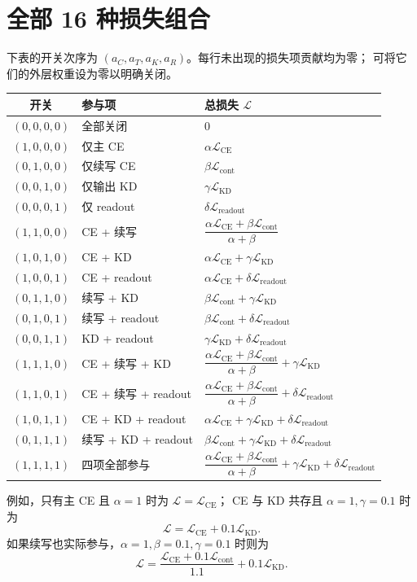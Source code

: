 \documentclass[UTF8,a4paper,11pt]{ctexart}
\newcommand{\CE}{\mathcal{L}_{\mathrm{CE}}}
\newcommand{\CT}{\mathcal{L}_{\mathrm{cont}}}
\newcommand{\KD}{\mathcal{L}_{\mathrm{KD}}}
\newcommand{\RO}{\mathcal{L}_{\mathrm{readout}}}
\begin{document}
\section{全部 16 种损失组合}

下表的开关次序为 $(a_C,a_T,a_K,a_R)$。每行未出现的损失项贡献均为零；
可将它们的外层权重设为零以明确关闭。

\begin{longtable}{cll}
\toprule
开关 & 参与项 & 总损失 $\mathcal{L}$ \\
\midrule
\endhead
$(0,0,0,0)$ & 全部关闭 & $0$ \\
$(1,0,0,0)$ & 仅主 CE & $\alpha\CE$ \\
$(0,1,0,0)$ & 仅续写 CE & $\beta\CT$ \\
$(0,0,1,0)$ & 仅输出 KD & $\gamma\KD$ \\
$(0,0,0,1)$ & 仅 readout & $\delta\RO$ \\
\addlinespace
$(1,1,0,0)$ & CE + 续写 & $\dfrac{\alpha\CE+\beta\CT}{\alpha+\beta}$ \\[6pt]
$(1,0,1,0)$ & CE + KD & $\alpha\CE+\gamma\KD$ \\
$(1,0,0,1)$ & CE + readout & $\alpha\CE+\delta\RO$ \\
$(0,1,1,0)$ & 续写 + KD & $\beta\CT+\gamma\KD$ \\
$(0,1,0,1)$ & 续写 + readout & $\beta\CT+\delta\RO$ \\
$(0,0,1,1)$ & KD + readout & $\gamma\KD+\delta\RO$ \\
\addlinespace
$(1,1,1,0)$ & CE + 续写 + KD & $\dfrac{\alpha\CE+\beta\CT}{\alpha+\beta}+\gamma\KD$ \\[6pt]
$(1,1,0,1)$ & CE + 续写 + readout & $\dfrac{\alpha\CE+\beta\CT}{\alpha+\beta}+\delta\RO$ \\[6pt]
$(1,0,1,1)$ & CE + KD + readout & $\alpha\CE+\gamma\KD+\delta\RO$ \\
$(0,1,1,1)$ & 续写 + KD + readout & $\beta\CT+\gamma\KD+\delta\RO$ \\
$(1,1,1,1)$ & 四项全部参与 & $\dfrac{\alpha\CE+\beta\CT}{\alpha+\beta}+\gamma\KD+\delta\RO$ \\[6pt]
\bottomrule
\end{longtable}

例如，只有主 CE 且 $\alpha=1$ 时为 $\mathcal{L}=\CE$；
CE 与 KD 共存且 $\alpha=1,\gamma=0.1$ 时为
\begin{equation}
\mathcal{L}=\CE+0.1\KD.
\end{equation}
如果续写也实际参与，$\alpha=1,\beta=0.1,\gamma=0.1$ 时则为
\begin{equation}
\mathcal{L}=\frac{\CE+0.1\CT}{1.1}+0.1\KD.
\end{equation}
\end{document}
